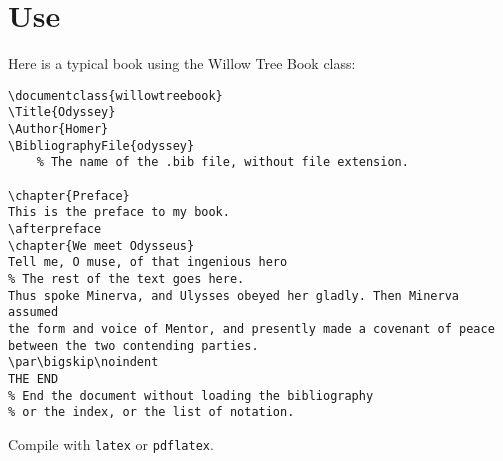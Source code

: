 \chapter{Use}
Here is a typical book using the Willow Tree Book class:

\begin{Verbatim}[frame=leftline]
\documentclass{willowtreebook}
\Title{Odyssey}
\Author{Homer}
\BibliographyFile{odyssey}
	% The name of the .bib file, without file extension.

\chapter{Preface}
This is the preface to my book.
\afterpreface
\chapter{We meet Odysseus}
Tell me, O muse, of that ingenious hero
% The rest of the text goes here.
Thus spoke Minerva, and Ulysses obeyed her gladly. Then Minerva assumed
the form and voice of Mentor, and presently made a covenant of peace
between the two contending parties.
\par\bigskip\noindent
THE END
% End the document without loading the bibliography
% or the index, or the list of notation.

\end{Verbatim}

Compile with \verb!latex! or \verb!pdflatex!.